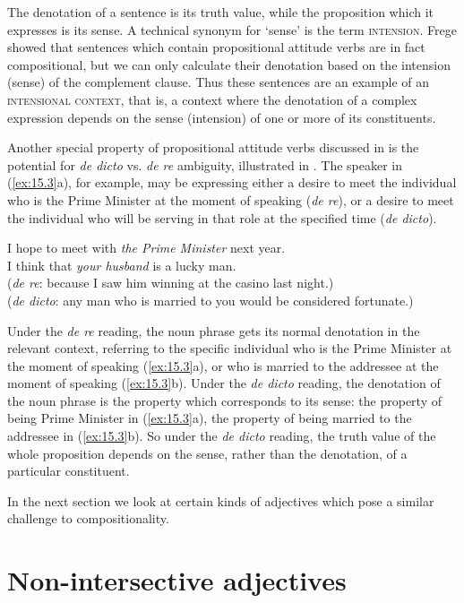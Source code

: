 The denotation of a sentence is its truth value, while the proposition which it expresses is its sense. A technical synonym for ‘sense’ is the term \textsc{intension}. Frege showed that sentences which contain propositional attitude verbs are in fact compositional, but we can only calculate their denotation based on the intension (sense) of the complement clause. Thus these sentences are an example of an \textsc{intensional context}, that is, a context where the denotation of a complex expression depends on the sense (intension) of one or more of its constituents.



Another special property of propositional attitude verbs discussed in  is the potential for \textit{de dicto} vs. \textit{de re} ambiguity, illustrated in . The speaker in (\ref{ex:15.3}a), for example, may be expressing either a desire to meet the individual who is the Prime Minister at the moment of speaking (\textit{de re}), or a desire to meet the individual who will be serving in that role at the specified time (\textit{de dicto}).


\ea \label{ex:15.3}
\ea  I hope to meet with \textit{the Prime Minister} next year.\\
\ex I think that \textit{your husband} is a lucky man.\\
  (\textit{de re}: because I saw him winning at the casino last night.)\\
  (\textit{de dicto}: any man who is married to you would be considered fortunate.)
                       \z
\z


Under the \textit{de re} reading, the noun phrase gets its normal denotation in the relevant context, referring to the specific individual who is the Prime Minister at the moment of speaking (\ref{ex:15.3}a), or who is married to the addressee at the moment of speaking (\ref{ex:15.3}b). Under the \textit{de dicto} reading, the denotation of the noun phrase is the property which corresponds to its sense: the property of being Prime Minister in (\ref{ex:15.3}a), the property of being married to the addressee in (\ref{ex:15.3}b). So under the \textit{de dicto} reading, the truth value of the whole proposition depends on the sense, rather than the denotation, of a particular constituent.



In the next section we look at certain kinds of adjectives which pose a similar challenge to compositionality.


\section{Non-intersective adjectives}\label{sec:15.3}

